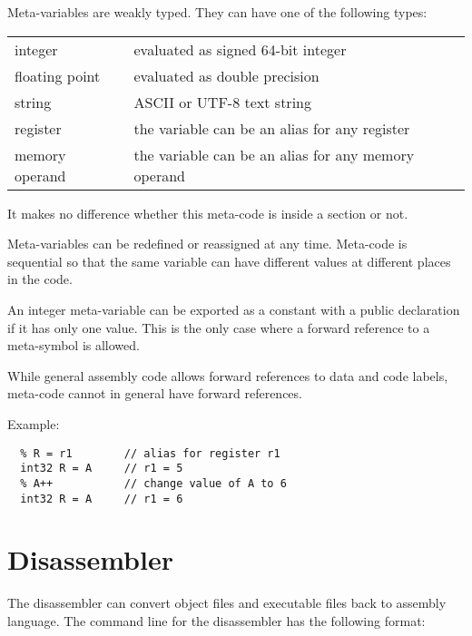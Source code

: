 \documentclass[forwardcom.tex]{subfiles}
\begin{document}
Meta-variables are weakly typed. They can have one of the following types:

\begin{tabular}{|p{30mm}p{120mm}|}
\hline
integer & evaluated as signed 64-bit integer \\
floating point & evaluated as double precision\\
string & ASCII or UTF-8 text string\\
register & the variable can be an alias for any register\\
memory operand & the variable can be an alias for any memory operand\\
\hline
\end{tabular}
\vspace{2mm}

It makes no difference whether this meta-code is inside a section or not.
\vspace{2mm}

Meta-variables can be redefined or reassigned at any time. Meta-code is sequential so that the same variable can have different values at different places in the code.
\vspace{2mm}

An integer meta-variable can be exported as a constant with a public declaration if it has only one value. This is the only case where a forward reference to a meta-symbol is allowed.
\vspace{2mm}

While general assembly code allows forward references to data and code labels, meta-code cannot in general have forward references.
\vspace{2mm}

Example:
\vspace{2mm}

\begin{lstlisting}[frame=single]
  % A = 5         // meta-variable integer A = 5
  % R = r1        // alias for register r1
  int32 R = A     // r1 = 5
  % A++           // change value of A to 6
  int32 R = A     // r1 = 6
\end{lstlisting}
\vspace{2mm}


\section{Disassembler} \label{disassembler}

The disassembler can convert object files and executable files back to assembly language.
The command line for the disassembler has the following format:
\end{document}

